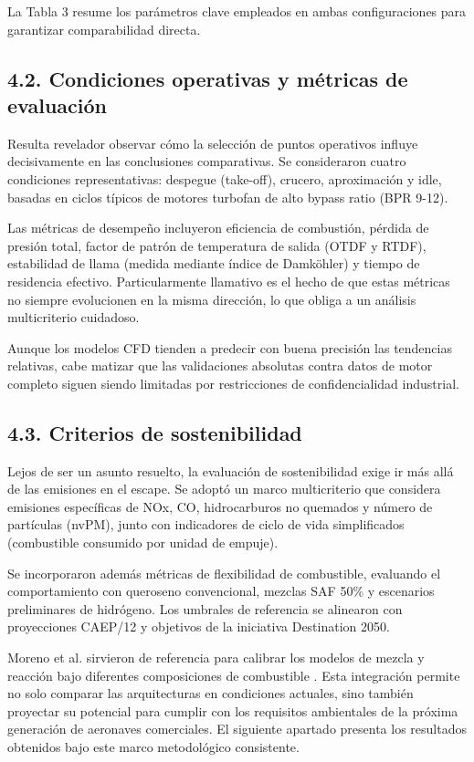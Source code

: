 La Tabla 3 resume los parámetros clave empleados en ambas configuraciones para garantizar comparabilidad directa.

\subsection{4.2. Condiciones operativas y métricas de evaluación}

Resulta revelador observar cómo la selección de puntos operativos influye decisivamente en las conclusiones comparativas. Se consideraron cuatro condiciones representativas: despegue (take-off), crucero, aproximación y idle, basadas en ciclos típicos de motores turbofan de alto bypass ratio (BPR 9-12).

Las métricas de desempeño incluyeron eficiencia de combustión, pérdida de presión total, factor de patrón de temperatura de salida (OTDF y RTDF), estabilidad de llama (medida mediante índice de Damköhler) y tiempo de residencia efectivo. Particularmente llamativo es el hecho de que estas métricas no siempre evolucionen en la misma dirección, lo que obliga a un análisis multicriterio cuidadoso.

Aunque los modelos CFD tienden a predecir con buena precisión las tendencias relativas, cabe matizar que las validaciones absolutas contra datos de motor completo siguen siendo limitadas por restricciones de confidencialidad industrial.

\subsection{4.3. Criterios de sostenibilidad}

Lejos de ser un asunto resuelto, la evaluación de sostenibilidad exige ir más allá de las emisiones en el escape. Se adoptó un marco multicriterio que considera emisiones específicas de NOx, CO, hidrocarburos no quemados y número de partículas (nvPM), junto con indicadores de ciclo de vida simplificados (combustible consumido por unidad de empuje).

Se incorporaron además métricas de flexibilidad de combustible, evaluando el comportamiento con queroseno convencional, mezclas SAF 50\% y escenarios preliminares de hidrógeno. Los umbrales de referencia se alinearon con proyecciones CAEP/12 y objetivos de la iniciativa Destination 2050.

Moreno et al. sirvieron de referencia para calibrar los modelos de mezcla y reacción bajo diferentes composiciones de combustible \cite{Moreno2024}. Esta integración permite no solo comparar las arquitecturas en condiciones actuales, sino también proyectar su potencial para cumplir con los requisitos ambientales de la próxima generación de aeronaves comerciales. El siguiente apartado presenta los resultados obtenidos bajo este marco metodológico consistente.
